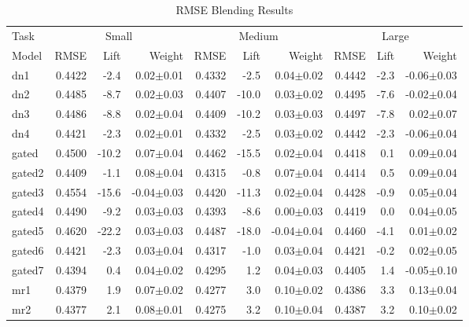 \documentclass{article}
\begin{document}
\begin{table*}
\caption{RMSE Blending Results}
\label{table:rmse-results}
\vskip 0.15in
\begin{center}
\begin{small}
\begin{sc}
\begin{tabular}{l|rr r|rr r|rr r}
\hline
\abovespace\belowspace
Task & \multicolumn{3}{|c}{Small} & \multicolumn{3}{|c}{Medium} & \multicolumn{3}{|c}{Large} \\
Model
& RMSE & Lift & Weight 
& RMSE & Lift & Weight 
& RMSE & Lift & Weight \\
\hline
\abovespace
dn1        & 0.4422 &  -2.4 &  0.02$\pm$0.01& 0.4332 &  -2.5 &  0.04$\pm$0.02& 0.4442 &  -2.3 & -0.06$\pm$0.03 \\ 
dn2        & 0.4485 &  -8.7 &  0.02$\pm$0.03& 0.4407 & -10.0 &  0.03$\pm$0.02& 0.4495 &  -7.6 & -0.02$\pm$0.04 \\ 
dn3        & 0.4486 &  -8.8 &  0.02$\pm$0.04& 0.4409 & -10.2 &  0.03$\pm$0.03& 0.4497 &  -7.8 &  0.02$\pm$0.07 \\ 
dn4        & 0.4421 &  -2.3 &  0.02$\pm$0.01& 0.4332 &  -2.5 &  0.03$\pm$0.02& 0.4442 &  -2.3 & -0.06$\pm$0.04 \\ 
\abovespace
gated      & 0.4500 & -10.2 &  0.07$\pm$0.04& 0.4462 & -15.5 &  0.02$\pm$0.04& 0.4418 &   0.1 &  0.09$\pm$0.04 \\ 
gated2     & 0.4409 &  -1.1 &  0.08$\pm$0.04& 0.4315 &  -0.8 &  0.07$\pm$0.04& 0.4414 &   0.5 &  0.09$\pm$0.04 \\ 
gated3     & 0.4554 & -15.6 & -0.04$\pm$0.03& 0.4420 & -11.3 &  0.02$\pm$0.04& 0.4428 &  -0.9 &  0.05$\pm$0.04 \\ 
gated4     & 0.4490 &  -9.2 &  0.03$\pm$0.03& 0.4393 &  -8.6 &  0.00$\pm$0.03& 0.4419 &   0.0 &  0.04$\pm$0.05 \\ 
gated5     & 0.4620 & -22.2 &  0.03$\pm$0.03& 0.4487 & -18.0 & -0.04$\pm$0.04& 0.4460 &  -4.1 &  0.01$\pm$0.02 \\ 
gated6     & 0.4421 &  -2.3 &  0.03$\pm$0.04& 0.4317 &  -1.0 &  0.03$\pm$0.04& 0.4421 &  -0.2 &  0.02$\pm$0.05 \\ 
gated7     & 0.4394 &   0.4 &  0.04$\pm$0.02& 0.4295 &   1.2 &  0.04$\pm$0.03& 0.4405 &   1.4 & -0.05$\pm$0.10 \\ 
\abovespace
mr1        & 0.4379 &   1.9 &  0.07$\pm$0.02& 0.4277 &   3.0 &  0.10$\pm$0.02& 0.4386 &   3.3 &  0.13$\pm$0.04 \\ 
mr2        & 0.4377 &   2.1 &  0.08$\pm$0.01& 0.4275 &   3.2 &  0.10$\pm$0.04& 0.4387 &   3.2 &  0.10$\pm$0.02 \\ 

\end{tabular}
\end{sc}
\end{small}
\end{center}
\end{table*}
\end{document}
